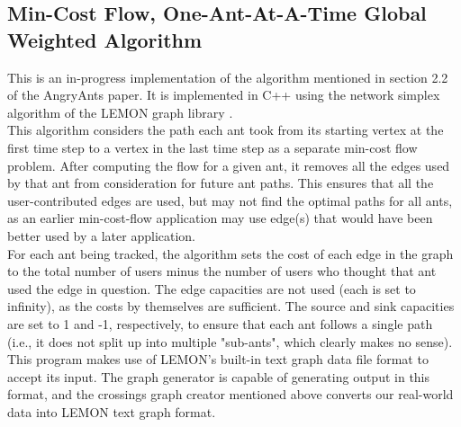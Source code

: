 \documentclass[12pt]{article}
\begin{document}
\subsection{Min-Cost Flow, One-Ant-At-A-Time Global Weighted Algorithm}

This is an in-progress implementation of the algorithm mentioned in section 2.2
of the AngryAnts paper. It is implemented in C++ using the network simplex
algorithm of the LEMON graph library \cite{LEMON}.\\
\indent This algorithm considers the path each ant took from its starting vertex at the
first time step to a vertex in the last time step as a separate min-cost flow
problem. After computing the flow for a given ant, it removes all the edges used
by that ant from consideration for future ant paths. This ensures that all the
user-contributed edges are used, but may not find the optimal paths for all
ants, as an earlier min-cost-flow application may use edge(s) that would have
been better used by a later application.\\
\indent For each ant being tracked, the algorithm sets the cost of each edge in the
graph to the total number of users minus the number of users who thought that
ant used the edge in question. The edge capacities are not used (each is set to
infinity), as the costs by themselves are sufficient. The source and sink
capacities are set to 1 and -1, respectively, to ensure that each ant follows a
single path (i.e., it does not split up into multiple "sub-ants", which
clearly makes no sense).\\
\indent This program makes use of LEMON's built-in text graph data file format to accept
its input. The graph generator is capable of generating output in this format,
and the crossings graph creator mentioned above converts our real-world data
into LEMON text graph format.
\end{document}

